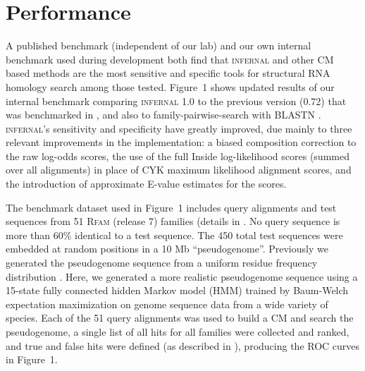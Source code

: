 \section{Performance}

A published benchmark (independent of our lab) \citep{Freyhult07} and
our own internal benchmark used during development
\citep{NawrockiEddy07} both find that \textsc{infernal} and other CM
based methods are the most sensitive and specific tools for structural
RNA homology search among those tested. Figure~1 shows
updated results of our internal benchmark comparing \textsc{infernal}
1.0 to the previous version (0.72) that was benchmarked in
\citet{Freyhult07}, and also to family-pairwise-search with BLASTN
\citep{Altschul97,Grundy98b}.  \textsc{infernal}'s sensitivity and
specificity have greatly improved, due mainly to 
three relevant improvements in the implementation: a biased
composition correction to the raw log-odds scores, the use of the full
Inside log-likelihood scores (summed over all alignments) in place of
CYK maximum likelihood alignment scores, and the introduction of
approximate E-value estimates for the scores.

The benchmark dataset used in Figure~1 includes query alignments and
test sequences from 51 \textsc{Rfam} (release 7) families (details in
\citep{NawrockiEddy07}.  No query sequence is more than 60\% identical
to a test sequence.  The 450 total test sequences were embedded at
random positions in a 10 Mb ``pseudogenome''.  Previously we generated
the pseudogenome sequence from a uniform residue frequency
distribution \citep{NawrockiEddy07}.  Here, we generated a more
realistic pseudogenome sequence using a 15-state fully connected
hidden Markov model (HMM) trained by Baum-Welch expectation
maximization \citep{Durbin98} on genome sequence data from a wide
variety of species.  Each of the 51 query alignments was used to build
a CM and search the pseudogenome, a single list of all hits for all
families were collected and ranked, and true and false hits were
defined (as described in \citet{NawrockiEddy07}), producing the ROC
curves in Figure~1.


